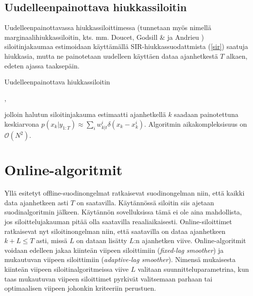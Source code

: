 \documentclass[
  12pt,
  a4paper, twoside]{book}
\begin{document}
\subsection{Uudelleenpainottava hiukkassiloitin}

Uudelleenpainottavassa hiukkassiloittimessa (tunnetaan myös nimellä marginaalihiukkassiloitin, kts. mm. Doucet, Godsill \& ja Andrieu \citep{Doucet-2000}) siloitinjakaumaa estimoidaan käyttämällä SIR-hiukkassuodattmista (\ref{sir}) saatuja hiukkasia, mutta ne painotetaan uudelleen käyttäen dataa ajanhetkestä \(T\) alkaen, edeten ajassa taaksepäin.

\begin{algorithm}[H]
\label{rwps}
\DontPrintSemicolon
\SetAlgoShortEnd
{}
\caption{Uudelleenpainottava hiukkassiloitin}
\end{algorithm}

,

jolloin halutun siloitinjakauma estimaatti ajanhetkellä \(k\) saadaan painotettuna keskiarvona \(p(x_k|y_{1:T}) \approx \sum_i w_{k|t}^i \delta (x_k-x_k^i)\). Algoritmin aikakompleksisuus on \(\mathcal{O}(N^2)\).

\section{Online-algoritmit}

Yllä esitetyt offline-suodinongelmat ratkaisevat suodinongelman niin, että kaikki data ajanhetkeen asti \(T\) on saatavilla. Käytännössä siloitin siis ajetaan suodinalgoritmin jälkeen. Käytännön sovelluksissa tämä ei ole aina mahdollista, jos siloittelujakauman pitää olla saatavilla reaaliaikaisesti. Online-siloittimet ratkaisevat nyt siloitinongelman niin, että saatavilla on dataa ajanhetkeen \(k+L \le T\) asti, missä \(L\) on dataan lisätty \(L\):n ajanhetken viive. Online-algoritmit voidaan edelleen jakaa kiinteän viipeen siloittimiin (\emph{fixed-lag smoother}) ja mukautuvan viipeen siloittimiin (\emph{adaptive-lag smoother}). Nimensä mukaisesta kiinteän viipeen siloitinalgoritmeissa viive \(L\) valitaan suunnitteluparametrina, kun taas mukautuvan viipeen siloittimet pyrkivät valitsemaan parhaan tai optimaalisen viipeen johonkin kriteeriin perustuen.
\end{document}
